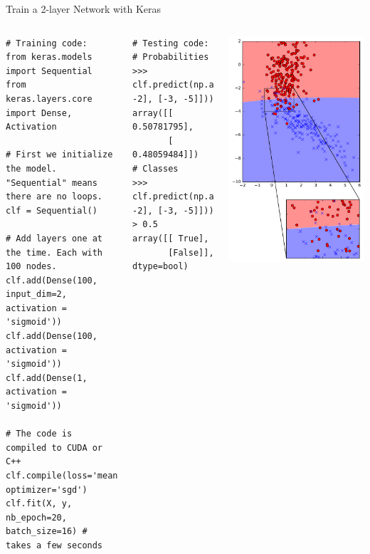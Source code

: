 \documentclass[10pt, aspectratio=169]{beamer} %
\begin{document}
\begin{frame}[fragile]{Train a 2-layer Network with Keras}
\begin{columns}
\begin{lstlisting}
# Training code:
from keras.models import Sequential
from keras.layers.core import Dense, Activation

# First we initialize the model. "Sequential" means there are no loops.
clf = Sequential()

# Add layers one at the time. Each with 100 nodes.
clf.add(Dense(100, input_dim=2, activation = 'sigmoid'))
clf.add(Dense(100, activation = 'sigmoid'))
clf.add(Dense(1, activation = 'sigmoid'))

# The code is compiled to CUDA or C++
clf.compile(loss='mean_squared_error', optimizer='sgd')
clf.fit(X, y, nb_epoch=20, batch_size=16) # takes a few seconds
\end{lstlisting}
\begin{lstlisting}
# Testing code:
# Probabilities
>>> clf.predict(np.array([[1, -2], [-3, -5]]))
array([[ 0.50781795],
       [ 0.48059484]])
# Classes
>>> clf.predict(np.array([[1, -2], [-3, -5]])) > 0.5
array([[ True],
       [False]], dtype=bool)
\end{lstlisting}
\centerline{\includegraphics[width=\columnwidth]{mlp.pdf}}

\end{columns}
\end{frame}
\end{document}
